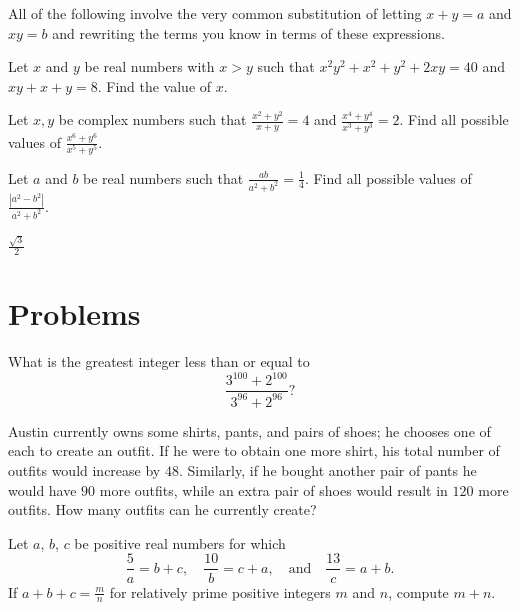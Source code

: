 \documentclass{article}
\begin{document}
All of the following involve the very common substitution of letting $x+y=a$ and $xy=b$ and rewriting the terms you know in terms of these expressions.
\begin{exam}
Let $x$ and $y$ be real numbers with $x > y$ such that $x^2 y^2 + x^2 + y^2 + 2xy = 40$ and $xy + x + y = 8$. Find
the value of $x$.
\end{exam}

\begin{exam}
Let $x,y$ be complex numbers such that $\frac{x^2+y^2}{x+y} = 4$ and $\frac{x^4+y^4}{x^3+y^3} = 2$. Find all possible values of 
$\frac{x^6+y^6}{x^5+y^5}$.
\end{exam}

\begin{exam}
Let $a$ and $b$ be real numbers such that $\frac{ab}{a^2+b^2}=\frac{1}{4}$. Find all possible values of $\frac{|a^2-b^2|}{a^2+b^2}$.
\end{exam}

\begin{sol}
$\frac{\sqrt{3}}{2}$
\end{sol}


\pagebreak\section{Problems}

\minpt{}


\begin{prob}[AMC 10A 2018/14]{2}
What is the greatest integer less than or equal to\[\frac{3^{100}+2^{100}}{3^{96}+2^{96}}?\]
\end{prob}

\begin{prob}[2008-2009 Mandelbrot]{3}
Austin currently owns some shirts, pants, and pairs of shoes; he chooses one of each to create an outfit. If he were to obtain one more shirt, his total number of outfits would increase by $48.$ Similarly, if he bought another pair of pants he would have $90$ more outfits, while an extra pair of shoes would result in $120$ more outfits. How many outfits can he currently create?
\end{prob}
  

\begin{prob}{4}
Let $a$, $b$, $c$ be positive real numbers for which
\[
  \frac{5}{a} = b+c, \quad
  \frac{10}{b} = c+a, \quad \text{and} \quad
  \frac{13}{c} = a+b.
\]
If $a+b+c = \frac mn$ for relatively prime positive integers $m$ and $n$, compute $m+n$.
\end{prob}
  
\end{document}
